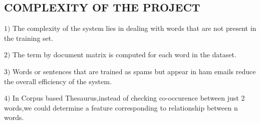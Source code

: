 \subsection{COMPLEXITY OF THE PROJECT}
$1)$ The complexity of the system lies in dealing with words that are not present in the training set.


$2)$ The term by document matrix is computed for each word in the dataset.


$3)$ Words or sentences that are trained as spams but appear in ham emails reduce the overall efficiency of the system.


$4)$ In Corpus based Thesaurus,instead of checking co-occurence between just 2 words,we could determine a feature corresponding to relationship between n words.	
